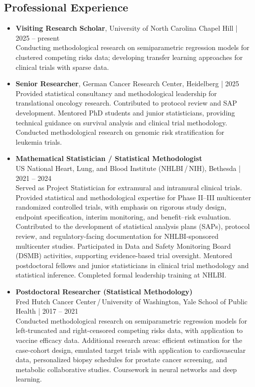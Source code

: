 \documentclass[a4paper,11pt]{article}
\begin{document}
\subsection*{\large Professional Experience}
\vspace{-0.5ex}
\begin{itemize}[leftmargin=1.2em]
 \item{\bf Visiting Research Scholar}, University of North Carolina Chapel Hill | 2025 -- present
 \\[0.2ex]
 Conducting methodological research on semiparametric regression models for clustered competing risks data; developing transfer learning approaches for clinical trials with sparse data.
  \item{\bf Senior Researcher}, German Cancer Research Center, Heidelberg | 2025
  \\[0.2ex]
  Provided statistical consultancy and methodological leadership for translational oncology research. Contributed to protocol review and SAP development. Mentored PhD students and junior statisticians, providing technical guidance on survival analysis and clinical trial methodology. Conducted methodological research on genomic risk stratification for leukemia trials.
 \item{\bf Mathematical Statistician / Statistical Methodologist} \\
	US National Heart, Lung, and Blood Institute (NHLBI\,/\,NIH), Bethesda | 2021 -- 2024
	\\[0.2ex]
Served as Project Statistician for extramural and intramural clinical trials. Provided statistical and methodological expertise for Phase II–III multicenter randomized controlled trials, with emphasis on rigorous study design, endpoint specification, interim monitoring, and benefit–risk evaluation. Contributed to the development of statistical analysis plans (SAPs), protocol review, and regulatory-facing documentation for NHLBI-sponsored multicenter studies. Participated in Data and Safety Monitoring Board (DSMB) activities, supporting evidence-based trial oversight. Mentored postdoctoral fellows and junior statisticians in clinical trial methodology and statistical inference. Completed formal leadership training at NHLBI.
%
 \item{\bf Postdoctoral Researcher (Statistical Methodology)}\\
	Fred Hutch Cancer Center\,/\,University of Washington, Yale School of Public Health | 2017 -- 2021\\[0.2ex]
	Conducted methodological research on semiparametric regression models for left-truncated and right-censored competing risks data, with application to vaccine efficacy data. Additional research areas: efficient estimation for the case-cohort design, emulated target trials with application to cardiovascular data, personalized biopsy schedules for prostate cancer screening, and metabolic collaborative studies. Coursework in neural networks and deep learning.
\end{itemize}
\end{document}
